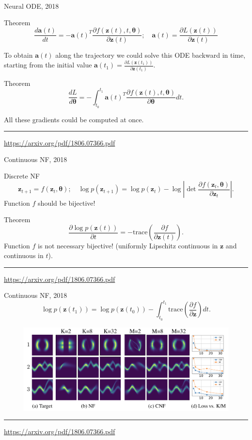 \documentclass{beamer}
\newcommand{\ba}{\mathbf{a}}
\newcommand{\bz}{\mathbf{z}}
\newcommand{\btheta}{\boldsymbol{\theta}}
\begin{document}
\begin{frame}{Neural ODE, 2018}
\begin{block}{Theorem}
\vspace{-0.2cm}
\[
    \frac{d \ba(t)}{dt} = - \ba(t)^T \frac{\partial f(\bz(t), t, \btheta)}{\partial \bz(t)}; \quad \ba(t) = \frac{\partial L(\bz(t))}{\partial \bz(t)}
\]
\end{block}

To obtain $\ba(t)$ along the trajectory we could solve this ODE backward in time, starting from the initial value $\ba(t_1) = \frac{\partial L(\bz(t_1))}{\partial \bz(t_1)}$.
\begin{block}{Theorem}
\vspace{-0.2cm}
\[
    \frac{dL}{d \btheta} = - \int_{t_0}^{t_1} \ba(t)^T \frac{\partial f(\bz(t), t, \btheta)}{\partial \btheta} dt.
\]
\end{block}
All these gradients could be computed at once.
\vfill
\hrule\medskip
{\scriptsize \href{https://arxiv.org/pdf/1806.07366.pdf}{https://arxiv.org/pdf/1806.07366.pdf}} 
\end{frame}
\begin{frame}{Continuous NF, 2018}
\begin{block}{Discrete NF}
\vspace{-0.2cm}
    \[
    \bz_{t+1} = f(\bz_t, \btheta); \quad \log p(\bz_{t+1}) = \log p(\bz_{t}) - \log \left| \det \frac{\partial f(\bz_t, \btheta)}{\partial \bz_{t}} \right| .
    \]
\vspace{-0.2cm}
Function $f$ should be bijective!
\end{block}
\begin{block}{Theorem}
\[
    \frac{\partial \log p(\bz(t))}{\partial t} = - \text{trace} \left( \frac{\partial f}{\partial \bz(t)} \right).
\]
Function $f$ is not necessary bijective! (uniformly Lipschitz continuous in $\bz$ and continuous in $t$).
\end{block}
\vfill
\hrule\medskip
{\scriptsize \href{https://arxiv.org/pdf/1806.07366.pdf}{https://arxiv.org/pdf/1806.07366.pdf}} 
\end{frame}
\begin{frame}{Continuous NF, 2018}
\[
    \log p(\bz(t_1)) = \log p(\bz(t_0)) - \int_{t_0}^{t_1} \text{trace} \left( \frac{\partial f}{\partial \bz} \right) dt.
\]
\begin{figure}
    \centering
    \includegraphics[width=0.5\linewidth]{figs/cnf.png}
\end{figure}
\vfill
\hrule\medskip
{\scriptsize \href{https://arxiv.org/pdf/1806.07366.pdf}{https://arxiv.org/pdf/1806.07366.pdf}} 
\end{frame}
\end{document}
